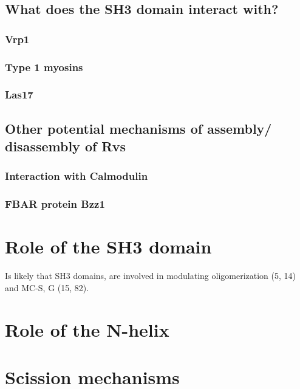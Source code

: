 	\subsection{What does the SH3 domain interact with?}
		\subsubsection{Vrp1}
		\subsubsection{Type 1 myosins}
		\subsubsection{Las17}


	\subsection{Other potential mechanisms of assembly/ disassembly of Rvs}		
			\subsubsection{Interaction with Calmodulin}
			\subsubsection{FBAR protein Bzz1}
				
\section{Role of the SH3 domain}	
Is likely that SH3 domains, are involved in modulating oligomerization (5, 14) and MC-S, G (15, 82). 	
\section{Role of the N-helix}			
		
\section{Scission mechanisms}

